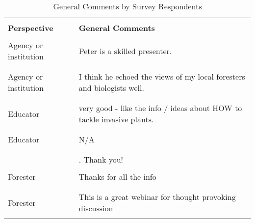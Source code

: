 \documentclass[
]{article}
\begin{document}
\begin{longtable}[t]{>{\raggedright\arraybackslash}p{5cm}>{\raggedright\arraybackslash}p{10cm}}
\caption{\label{tab:unnamed-chunk-12}General Comments by Survey Respondents}\\
\toprule
\multicolumn{2}{c}{ } \\

\begingroup\fontsize{14}{16}\selectfont \textbf{Perspective}\endgroup & \begingroup\fontsize{14}{16}\selectfont \textbf{General Comments}\endgroup\\
\midrule
\cellcolor{gray!10}{Agency or institution} & \cellcolor{gray!10}{Thanks for yet another very informative (and timely) webinar!}\\
\midrule
Agency or institution & Peter is a skilled presenter.\\
\midrule\\
\cellcolor{gray!10}{Agency or institution} & \cellcolor{gray!10}{Good information and good presentation}\\
\midrule
Agency or institution & I think he echoed the views of my local foresters and biologists well.\\
\midrule\\
\cellcolor{gray!10}{Agency or institution} & \cellcolor{gray!10}{Thank you.}\\
\midrule
\addlinespace
Educator & very good - like the info / ideas about HOW to tackle invasive plants.\\
\midrule\\
\cellcolor{gray!10}{Educator} & \cellcolor{gray!10}{Good work}\\
\midrule
Educator & N/A\\
\midrule\\
\cellcolor{gray!10}{Educator} & \cellcolor{gray!10}{Alway enjoy Pete's webinars}\\
\midrule
\cellcolor{gray!10}{Forester} & \cellcolor{gray!10}{Excellent presentation}.  Thank you!\\
\addlinespace
\cellcolor{gray!10}{Forester} & \cellcolor{gray!10}{Great \vphantom{1} presentation}\\
\midrule
Forester & Thanks for all the info\\
\midrule\\
\cellcolor{gray!10}{Forester} & \cellcolor{gray!10}{the program was thorough and informative}\\
\midrule
Forester & This is a great webinar for thought provoking discussion\\
\midrule\\

\end{longtable}
\end{document}
